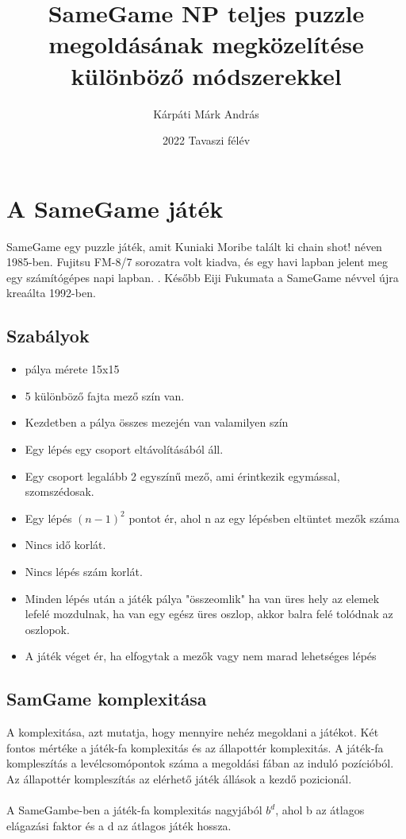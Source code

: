 \documentclass{article}
\title{SameGame NP teljes puzzle megoldásának megközelítése különböző módszerekkel}
\author{Kárpáti Márk András}
\date{2022 Tavaszi félév}
\begin{document}
	
	\maketitle
	
	
	\section{A SameGame játék}
	
	SameGame egy puzzle játék, amit Kuniaki Moribe talált ki chain shot! néven 1985-ben. Fujitsu FM-8/7 sorozatra volt kiadva, és egy havi lapban jelent meg egy számítógépes napi lapban. \cite{ChainShot1985}. Később Eiji Fukumata a SameGame névvel újra kreaálta 1992-ben.
	
	\subsection{Szabályok}
	
	\begin{itemize}		
		\item pálya mérete 15x15
		\item 5 különböző fajta mező szín van.
		\item Kezdetben a pálya összes mezején van valamilyen szín
		\item Egy lépés egy csoport eltávolításából áll.
		\item Egy csoport legalább 2 egyszínű mező, ami érintkezik egymással, szomszédosak.
		\item Egy lépés \( (n-1)^2 \) pontot ér, ahol n az egy lépésben eltüntet mezők száma
		\item Nincs idő korlát.
		\item Nincs lépés szám korlát.
		\item Minden lépés után a játék pálya "összeomlik" ha van üres hely az elemek lefelé mozdulnak, ha van egy egész üres oszlop, akkor balra felé tolódnak az oszlopok.
		\item A játék véget ér, ha elfogytak a mezők vagy nem marad lehetséges lépés
		
	\end{itemize}
	
	\subsection{SamGame komplexitása}
	
	A komplexitása, azt mutatja, hogy mennyire nehéz megoldani a játékot. Két fontos mértéke a játék-fa komplexitás és az állapottér komplexitás.\cite{allis1994searching} A játék-fa kompleszítás a levélcsomópontok száma a megoldási fában az induló pozícióból. Az állapottér kompleszítás az elérhető játék állások a kezdő pozicionál.
	\\	
	\\
	A SameGambe-ben a játék-fa komplexitás nagyjából \(b^d\), ahol b az átlagos elágazási faktor és a d az átlagos játék hossza.
	
\end{document}
